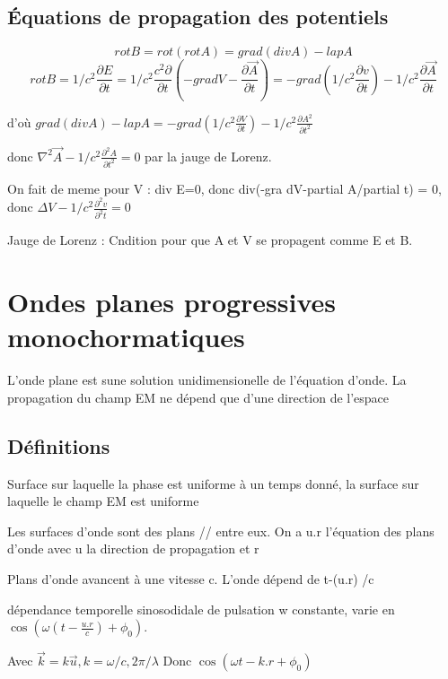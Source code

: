 \documentclass[french]{yLectureNote}
\renewcommand{\vec}{\overrightarrow}
\newcommand{\lap}{\nabla^2}
\begin{document}
\subsection{Équations de propagation des potentiels}
$$rot B = rot (rot A) = grad(div A)-lap A$$
$$rot B =1/c^2 \frac{\partial E}{\partial t} = 1/c^2 \frac{c^2\partial}{\partial t}(-grad V-\frac{\partial \vec{A}}{\partial t}) = -grad (1/c^2 \frac{\partial v}{\partial t})-1/c^2 \frac{\partial \vec{A}}{\partial t}$$

d'où $grad (div A)-lap A  = -grad (1/c^2 \frac{\partial V}{\partial t})-1/c^2 \frac{\partial A^2}{\partial t^2}$

donc $\lap \vec{A} -1/c^2 \frac{\partial^2 A}{\partial t^2} = 0$ par la jauge de Lorenz.

On fait de meme pour V : div E=0, donc div(-gra dV-partial A/partial t) = 0, donc $\Delta V - 1/c^2 \frac{\partial^2 v}{\partial^2 t} = 0$

Jauge de Lorenz : Cndition pour que A et V se propagent comme E et B.

\section{Ondes planes progressives monochormatiques}
L'onde plane est sune solution unidimensionelle de l'équation d'onde. La propagation du champ EM ne dépend que d'une direction de l'espace
\subsection{Définitions}
\begin{theorem}
    Surface sur laquelle la phase est uniforme à un temps donné, la surface sur laquelle le champ EM est uniforme
\end{theorem}
\begin{theorem}
    Les surfaces d'onde sont des plans // entre eux. On a u.r l'équation des plans d'onde avec u la direction de propagation et r
\end{theorem}
\begin{definition}
    Plans d'onde avancent à une vitesse c. L'onde dépend de t-(u.r) /c
\end{definition}
\begin{definition}[Monochromatique]
    dépendance temporelle sinosodidale de pulsation w constante, varie en $\cos(\omega(t-\frac{u.r}{c})+\phi_0)$.
\end{definition}
Avec $\vec{k} = k\vec{u}, k = \omega/c, 2\pi/\lambda$
Donc $\cos(\omega t - k.r +\phi_0)$
\end{document}
